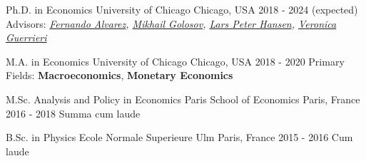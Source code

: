 

\begin{cventries}

    \cventry
    {Ph.D. in Economics} %
    {University of Chicago} %
    {Chicago, USA} %
    {2018 - 2024 (expected)} %
    {Advisors: \textit{\href{https://alvarezfernando.com/}{Fernando Alvarez}, \href{https://voices.uchicago.edu/golosov/contact/}{Mikhail Golosov}, \href{https://larspeterhansen.org/contact/}{Lars Peter Hansen}, \href{https://voices.uchicago.edu/veronicaguerrieri/contact/}{Veronica Guerrieri}}}

    \cventry
    {M.A. in Economics} %
    {University of Chicago} %
    {Chicago, USA} %
    {2018 - 2020} %
    {Primary Fields:
        \textbf{Macroeconomics}, \textbf{Monetary Economics}
    }

    \cventry
    {M.Sc. Analysis and Policy in Economics} %
    {Paris School of Economics} %
    {Paris, France} %
    {2016 - 2018} %
    {Summa cum laude}

    \cventry
    {B.Sc. in Physics} %
    {Ecole Normale Superieure Ulm} %
    {Paris, France} %
    {2015 - 2016} %
    {Cum laude}

\end{cventries}
